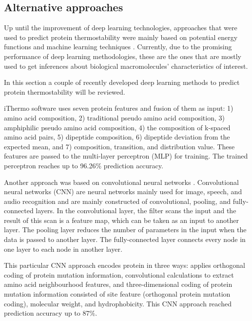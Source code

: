 \documentclass[12pt]{article}
\begin{document}
	\subsection{Alternative approaches}

	Up until the improvement of deep learning technologies,  
	approaches that were used to predict protein thermostability were mainly
	based on potential energy functions and machine learning techniques 
	\cite{modarres2016protein}. Currently, due to the promising performance 
	of deep learning methodologies, these are the ones that are mostly used 
	to get inferences about biological macromolecules' characteristics of 
	interest.

	In this section a couple of recently developed deep learning methods to 
	predict protein thermostability will be reviewed. 
	
	iThermo software \cite{ahmed2022ithermo} uses seven protein features 
	and fusion of them as input: 1) amino 
	acid composition, 2) traditional pseudo amino acid composition, 
	3) amphiphilic pseudo amino acid composition, 4) the composition of 
	k-spaced amino acid pairs, 5) dipeptide composition, 6) dipeptide 
	deviation from the expected mean, and 7) composition, transition, 
	and distribution value. These features are passed to the multi-layer 
	perceptron 
	(MLP) for training. The trained perceptron reaches up to 96.26\% 
	prediction accuracy.

	Another approach was based on convolutional neural networks 
	\cite{fang2019convolution}. Convolutional neural networks (CNN)
	are neural networks mainly used for image, speech, and audio recognition
	and are mainly constructed of convolutional, pooling, and fully-connected 
	layers. In the convolutional layer, the filter scans the input and the
	result of this scan is a feature map, which can be taken as an input
	to another layer. The pooling layer reduces the 
	number of parameters in the input when the data is passed to another 
	layer. The fully-connected layer connects 
	every node in one layer to each node in another layer.
	
	This particular CNN approach \cite{fang2019convolution} encodes protein 
	in three ways: applies orthogonal coding of protein mutation information, 
	convolutional calculations to extract amino acid neighbourhood 
	features, and three-dimensional coding of protein mutation information 
	consisted of site feature (orthogonal protein mutation coding), molecular 
	weight, and hydrophobicity. This CNN approach 
	reached prediction accuracy up to 87\%.
\end{document}
